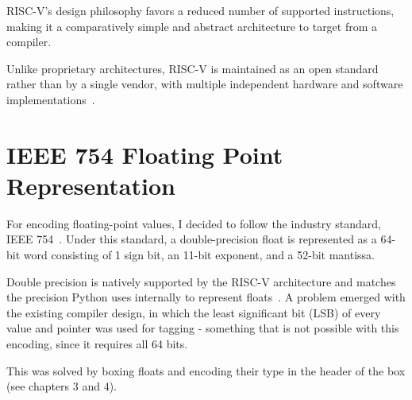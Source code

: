 RISC-V's design philosophy favors a reduced number of supported instructions, making it a comparatively simple and abstract architecture to target from a compiler.

Unlike proprietary architectures, RISC-V is maintained as an open standard rather than by a single vendor, with multiple independent hardware and software implementations~\citep{waterman2016riscv}.


\section{IEEE 754 Floating Point Representation}

For encoding floating-point values, I decided to follow the industry standard, IEEE 754~\citep{ieee754-2019}. Under this standard, a double-precision float is represented as a 64-bit word consisting of 1 sign bit, an 11-bit exponent, and a 52-bit mantissa.

Double precision is natively supported by the RISC-V architecture and matches the precision Python uses internally to represent floats~\citep{pythonfloatdocs}. A problem emerged with the existing compiler design, in which the least significant bit (LSB) of every value and pointer was used for tagging - something that is not possible with this encoding, since it requires all 64 bits.

This was solved by boxing floats and encoding their type in the header of the box (see chapters 3 and 4).